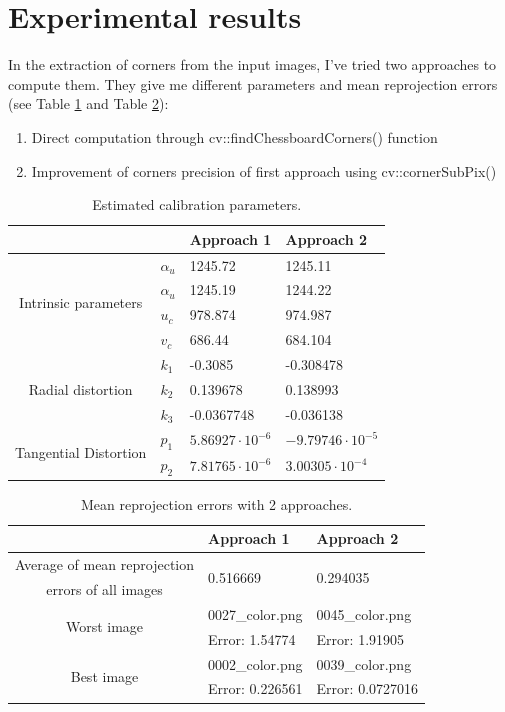 \documentclass{article}
\newcommand{\e}[1]{\cdot 10^{#1}}
\begin{document}
\section{Experimental results}
In the extraction of corners from the input images, I've tried two approaches to compute them. They give me different parameters and mean reprojection errors (see Table \ref{calib} and Table \ref{mean}):
\begin{enumerate}
\item{Direct computation through cv::findChessboardCorners() function}
\item{Improvement of corners precision of first approach using cv::cornerSubPix()\\}
\end{enumerate}
\begin{table}[h]
\centering
\begin{tabular}{|c|l|l|l|}
\cline{3-4}
\multicolumn{1}{c}{}&\multicolumn{1}{c|}{}&{\textbf{Approach 1}}&{\textbf{Approach 2}}\\
\hline
\multirow{4}{*}{Intrinsic parameters}&{$\alpha_u$}&{1245.72}&{1245.11}\\
\cline{2-4}
&{$\alpha_u$}&{1245.19}&{1244.22}\\
\cline{2-4}
&{$u_c$}&{978.874}&{974.987}\\
\cline{2-4}
&{$v_c$}&{686.44}&{684.104}\\
\hline
\multirow{3}{*}{Radial distortion}&{$k_1$}&{-0.3085}&{-0.308478}\\
\cline{2-4}
&{$k_2$}&{0.139678}&{0.138993}\\
\cline{2-4}
&{$k_3$}&{-0.0367748}&{-0.036138}\\
\hline
\multirow{2}{*}{Tangential Distortion}&{$p_1$}&{$5.86927\e{-6}$}&{$-9.79746\e{-5}$}\\
\cline{2-4}
&{$p_2$}&{$7.81765\e{-6}$}&{$3.00305\e{-4}$}\\
\hline
\end{tabular}
\caption{Estimated calibration parameters.}\label{calib}
\end{table}
\begin{table}[h]
\centering
\begin{tabular}{|c|l|l|}
\cline{2-3}
\multicolumn{1}{c|}{}&{\textbf{Approach 1}}&{\textbf{Approach 2}}\\
\hline
{Average of mean reprojection}&\multirow{2}{*}{0.516669}&\multirow{2}{*}{0.294035}\\
{errors of all images}&&\\
\hline
\multirow{2}{*}{Worst image}&{0027\_color.png}&{0045\_color.png}\\
&{Error: 1.54774}&{Error: 1.91905}\\
\hline
\multirow{2}{*}{Best image}&{0002\_color.png}&{0039\_color.png}\\
&{Error: 0.226561}&{Error: 0.0727016}\\
\hline
\end{tabular}
\caption{Mean reprojection errors with 2 approaches.}\label{mean}
\end{table}
\end{document}
